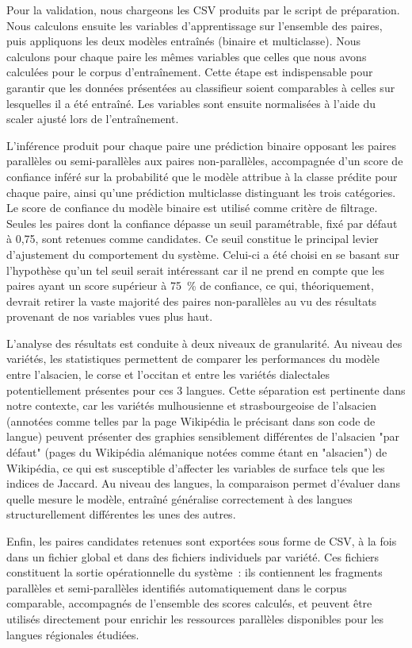 Pour la validation, nous chargeons les CSV produits par le script de préparation. Nous calculons ensuite les variables
d'apprentissage sur l'ensemble des paires, puis appliquons les deux modèles entraînés (binaire et multiclasse). 
Nous calculons pour chaque paire les mêmes variables que celles que nous avons calculées pour le corpus d'entraînement.
Cette étape est indispensable pour garantir
que les données présentées au classifieur soient comparables à celles sur lesquelles il
a été entraîné. Les variables sont ensuite normalisées à l'aide du scaler ajusté lors de l'entraînement.

L'inférence produit pour chaque paire une prédiction binaire opposant les paires parallèles ou semi-parallèles
aux paires non-parallèles, accompagnée d'un score de confiance inféré sur la
probabilité que le modèle attribue à la classe prédite pour chaque paire, ainsi qu'une prédiction multiclasse
distinguant les trois catégories. Le score de confiance du modèle binaire est utilisé comme critère de
filtrage. Seules les paires dont la confiance dépasse un seuil paramétrable, fixé par défaut à 0,75, sont
retenues comme candidates. Ce seuil constitue le principal levier d'ajustement du comportement du système.
Celui-ci a été choisi en se basant sur l'hypothèse qu'un tel seuil serait intéressant car il ne prend en
compte que les paires ayant un score supérieur à 75~\% de confiance, ce qui, théoriquement, devrait retirer
la vaste majorité des paires non-parallèles au vu des résultats provenant de nos variables vues plus haut.

L'analyse des résultats est conduite à deux niveaux de granularité. Au niveau des variétés, les statistiques
permettent de comparer les performances du modèle entre l'alsacien, le corse et l'occitan et entre les
variétés dialectales potentiellement présentes pour ces 3 langues. Cette séparation est pertinente dans
notre contexte, car les variétés mulhousienne et strasbourgeoise de l'alsacien
(annotées comme telles par la page Wikipédia le précisant dans son code de langue) peuvent présenter des graphies
sensiblement différentes de l'alsacien "par défaut" (pages du Wikipédia alémanique notées comme étant en "alsacien")
de Wikipédia, ce qui est susceptible d'affecter les variables de surface
tels que les indices de Jaccard. Au niveau des langues, la comparaison permet d'évaluer dans quelle
mesure le modèle, entraîné généralise correctement à des langues
structurellement différentes les unes des autres.

Enfin, les paires candidates retenues sont exportées sous forme de CSV, à la fois dans un fichier global
et dans des fichiers individuels par variété. Ces fichiers constituent la sortie opérationnelle du système~:
ils contiennent les fragments parallèles et semi-parallèles identifiés automatiquement dans le corpus
comparable, accompagnés de l'ensemble des scores calculés, et peuvent être utilisés directement pour enrichir
les ressources parallèles disponibles pour les langues régionales étudiées.

